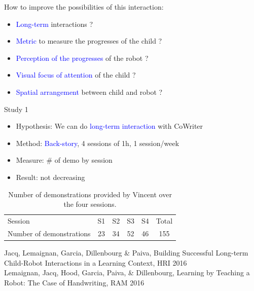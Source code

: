\documentclass[compress]{beamer}
\renewcommand{\bf}{\Medium}
\begin{document}
\begin{frame}

{\bf How to improve the possibilities of this interaction}:
\begin{itemize}
\item \textcolor{blue}{Long-term} interactions ?
\item \textcolor{blue}{Metric} to measure the progresses of the child ?
\item \textcolor{blue}{Perception of the progresses} of the robot ? %
\item \textcolor{blue}{Visual focus of attention} of the child ? 
\item \textcolor{blue}{Spatial arrangement} between child and robot ?
\end{itemize}
\end{frame}

\begin{frame}{Study 1}

    \begin{itemize}
    \item {\bf Hypothesis}: We can do \textcolor{blue}{long-term interaction} with CoWriter
    \item {\bf Method}: \textcolor{blue}{Back-story}, 4 sessions of 1h, 1 session/week
    \item {\bf Measure}: \# of demo by session
    \item {\bf Result}: not decreasing
    \end{itemize}
    
    \begin{table}
    \centering
    \caption{\footnotesize Number of demonstrations provided by Vincent over the four sessions.}
    \begin{tabular}{lccccc}
        \toprule
        Session & S1 & S2 & S3 & S4 & Total\\ 
        Number of demonstrations & 23 & 34 & 52 & 46 & 155\\ 
        \bottomrule

    \end{tabular}
\end{table}

\tiny{Jacq, Lemaignan, Garcia, Dillenbourg \& Paiva, {\bf Building Successful Long-term Child-Robot Interactions in a Learning Context}, HRI 2016}\\
\tiny{Lemaignan, Jacq, Hood, Garcia, Paiva, \& Dillenbourg, {\bf Learning by Teaching a Robot: The Case of Handwriting}, RAM 2016}
\end{frame}
\end{document}
